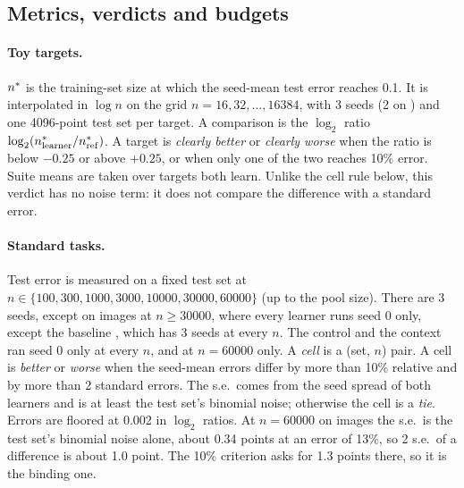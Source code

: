 \subsection{Metrics, verdicts and budgets}\label{sec:metrics}

\paragraph{Toy targets.} $n^{*}$ is the training-set size at which the seed-mean test error reaches 0.1. It is interpolated in $\log n$ on the grid $n=16,32,\dots,16384$, with 3 seeds (2 on ) and one 4096-point test set per target. A comparison is the $\log_2$ ratio $\log_2(n^{*}_{\rm learner}/n^{*}_{\rm ref})$. A target is \emph{clearly better} or \emph{clearly worse} when the ratio is below $-0.25$ or above $+0.25$, or when only one of the two reaches 10\% error. Suite means are taken over targets both learn. Unlike the cell rule below, this verdict has no noise term: it does not compare the difference with a standard error.

\paragraph{Standard tasks.} Test error is measured on a fixed test set at $n\in\{100,300,1000,\allowbreak3000,10000,\allowbreak30000,60000\}$ (up to the pool size). There are 3 seeds, except on images at $n\ge30000$, where every learner runs seed 0 only, except the baseline , which has 3 seeds at every $n$. The control  and the context  ran seed 0 only at every $n$, and  at $n=60000$ only. A \emph{cell} is a (set, $n$) pair. A cell is \emph{better} or \emph{worse} when the seed-mean errors differ by more than 10\% relative and by more than 2 standard errors. The s.e.\ comes from the seed spread of both learners and is at least the test set's binomial noise; otherwise the cell is a \emph{tie}. Errors are floored at 0.002 in $\log_2$ ratios. At $n=60000$ on images the s.e.\ is the test set's binomial noise alone, about 0.34 points at an error of 13\%, so 2 s.e.\ of a difference is about 1.0 point. The 10\% criterion asks for 1.3 points there, so it is the binding one.

